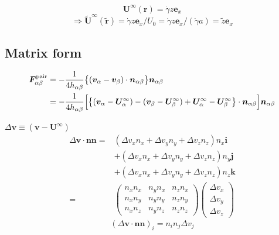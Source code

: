 \documentclass[12pt]{article}
\begin{document}
\begin{equation}
 \bm{U}^{\infty}(\bm{r})
 = 
 \dot{\gamma} z \bm{e}_{x}
\end{equation}
\begin{equation}
\Longrightarrow
  \tilde{\bm{U}}^{\infty}(\tilde{\bm{r}})
 = 
 \dot{\gamma} z \bm{e}_{x} / U_0
=  \dot{\gamma} z \bm{e}_{x} / (\dot{\gamma} a)
= \tilde{z} \bm{e}_{x} 
\end{equation}


\subsection*{Matrix form}
\begin{align*}
 \bm{F}_{\alpha\beta}^{\mathrm{pair}}
&= 
- \frac{1}{4 h_{\alpha\beta}}
\bigl\{
(\bm{v}_\alpha-
\bm{v}_\beta)\cdot
\bm{n}_{\alpha\beta}
\bigr\}\bm{n}_{\alpha\beta} \\
&=
- \frac{1}{4 h_{\alpha\beta}}
\Bigl[
\bigl\{
(\bm{v}_\alpha- \bm{U}^{\infty}_\alpha)-
(\bm{v}_\beta- \bm{U}^{\infty}_\beta)
+ \bm{U}^{\infty}_\alpha
- \bm{U}^{\infty}_\beta
\bigr\}\cdot
\bm{n}_{\alpha\beta}
\Bigr]
\bm{n}_{\alpha\beta}
\end{align*}


$\Delta \bm{v} \equiv (\bm{v}- \bm{U}^{\infty})$
\begin{align*}
\Delta \bm{v} \cdot
\bm{n} \bm{n}
= &
(\Delta v_x n_x 
+\Delta v_y n_y
+\Delta v_z n_z) n_x \bm{i}\\
& 
+ (\Delta v_x n_x 
+\Delta v_y n_y
+\Delta v_z n_z) n_y \bm{j}\\
&
+ (\Delta v_x n_x 
+\Delta v_y n_y
+\Delta v_z n_z) n_z \bm{k} \\
=&
\begin{pmatrix}
 n_x n_x &   n_y n_x &   n_z n_x \\
 n_x n_y &   n_y n_y &   n_z n_y \\
 n_x n_z &   n_y n_z &   n_z n_z 
\end{pmatrix}
\begin{pmatrix}
 \Delta v_x \\
 \Delta v_y \\
 \Delta v_z 
\end{pmatrix} 
\end{align*}
\begin{equation*}
(\Delta \bm{v} \cdot
\bm{n} \bm{n})_i
= n_i n_j \Delta v_j
\end{equation*}
\end{document}
